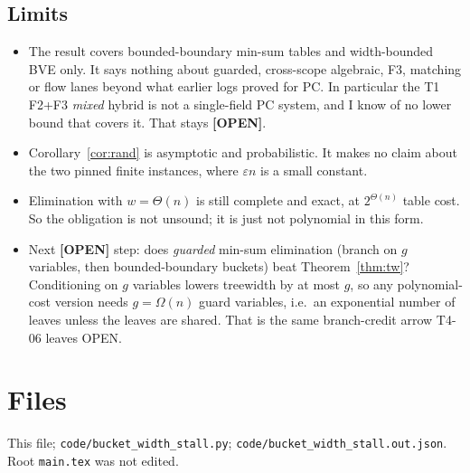 \documentclass[11pt]{article}
\theoremstyle{definition}
\theoremstyle{remark}
\newcommand{\lab}[1]{\textbf{[#1]}}
\begin{document}
\subsection{Limits}
\begin{itemize}
\item The result covers bounded-boundary min-sum tables and width-bounded BVE only. It
says nothing about guarded, cross-scope algebraic, F3, matching or flow lanes beyond what
earlier logs proved for PC. In particular the T1 F2+F3 \emph{mixed} hybrid is not a
single-field PC system, and I know of no lower bound that covers it. That stays
\lab{OPEN}.
\item Corollary~\ref{cor:rand} is asymptotic and probabilistic. It makes no claim about the
two pinned finite instances, where $\varepsilon n$ is a small constant.
\item Elimination with $w=\Theta(n)$ is still complete and exact, at $2^{\Theta(n)}$ table
cost. So the obligation is not unsound; it is just not polynomial in this form.
\item Next \lab{OPEN} step: does \emph{guarded} min-sum elimination (branch on $g$
variables, then bounded-boundary buckets) beat Theorem~\ref{thm:tw}? Conditioning on $g$
variables lowers treewidth by at most $g$, so any polynomial-cost version needs
$g=\Omega(n)$ guard variables, i.e.\ an exponential number of leaves unless the leaves
are shared. That is the same branch-credit arrow T4-06 leaves OPEN.
\end{itemize}

\section{Files}
This file; \texttt{code/bucket\_width\_stall.py}; \texttt{code/bucket\_width\_stall.out.json}.
Root \texttt{main.tex} was not edited.
\end{document}
